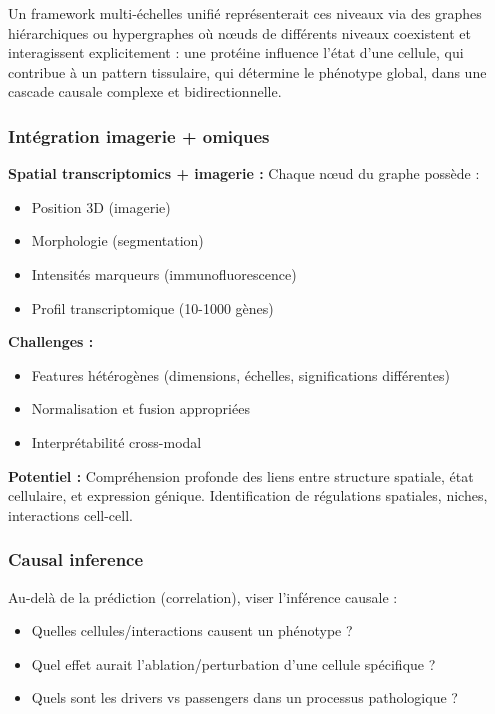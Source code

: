 Un framework multi-échelles unifié représenterait ces niveaux via des graphes hiérarchiques ou hypergraphes où nœuds de différents niveaux coexistent et interagissent explicitement : une protéine influence l'état d'une cellule, qui contribue à un pattern tissulaire, qui détermine le phénotype global, dans une cascade causale complexe et bidirectionnelle.

\subsubsection{Intégration imagerie + omiques}

\textbf{Spatial transcriptomics + imagerie :}
Chaque nœud du graphe possède :
\begin{itemize}
    \item Position 3D (imagerie)
    \item Morphologie (segmentation)
    \item Intensités marqueurs (immunofluorescence)
    \item Profil transcriptomique (10-1000 gènes)
\end{itemize}

\textbf{Challenges :}
\begin{itemize}
    \item Features hétérogènes (dimensions, échelles, significations différentes)
    \item Normalisation et fusion appropriées
    \item Interprétabilité cross-modal
\end{itemize}

\textbf{Potentiel :}
Compréhension profonde des liens entre structure spatiale, état cellulaire, et expression génique. Identification de régulations spatiales, niches, interactions cell-cell.

\subsubsection{Causal inference}

Au-delà de la prédiction (correlation), viser l'inférence causale :
\begin{itemize}
    \item Quelles cellules/interactions causent un phénotype ?
    \item Quel effet aurait l'ablation/perturbation d'une cellule spécifique ?
    \item Quels sont les drivers vs passengers dans un processus pathologique ?
\end{itemize}

